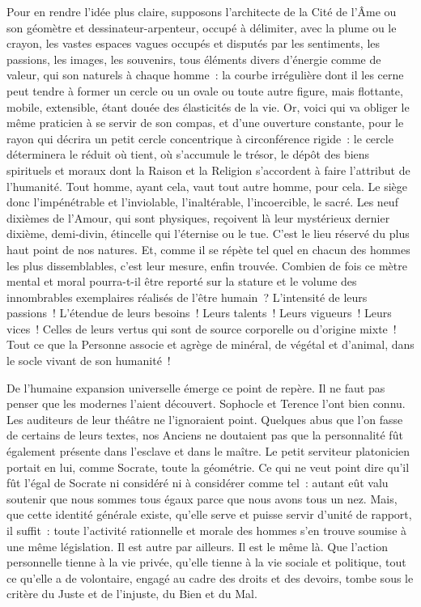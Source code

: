 \documentclass[french,twoside]{book} %
\begin{document}
Pour en rendre l’idée plus claire, supposons l’architecte de la Cité de l’Âme ou son géomètre et dessinateur-arpenteur, occupé à délimiter, avec la plume ou le crayon, les vastes espaces vagues occupés et disputés par les sentiments, les passions, les images, les souvenirs, tous éléments divers d’énergie comme de valeur, qui son naturels à chaque homme : la courbe irrégulière dont il les cerne peut tendre à former un cercle ou un ovale ou toute autre figure, mais flottante, mobile, extensible, étant douée des élasticités de la vie. Or, voici qui va obliger le même praticien à se servir de son compas, et d’une ouverture constante, pour le rayon qui décrira un petit cercle concentrique à circonférence rigide : le cercle déterminera le réduit où tient, où s’accumule le trésor, le dépôt des biens spirituels et moraux dont la Raison et la Religion s’accordent à faire l’attribut de l’humanité. Tout homme, ayant cela, vaut tout autre homme, pour cela. Le siège donc l’impénétrable et l’inviolable, l’inaltérable, l’incoercible, le sacré. Les neuf dixièmes de l’Amour, qui sont physiques, reçoivent là leur mystérieux dernier dixième, demi-divin, étincelle qui l’éternise ou le tue. C’est le lieu réservé du plus haut point de nos natures. Et, comme il se répète tel quel en chacun des hommes les plus dissemblables, c’est leur mesure, enfin trouvée. Combien de fois ce mètre mental et moral pourra-t-il être reporté sur la stature et le volume des innombrables exemplaires réalisés de l’être humain ? L’intensité de leurs passions ! L’étendue de leurs besoins ! Leurs talents ! Leurs vigueurs ! Leurs vices ! Celles de leurs vertus qui sont de source corporelle ou d’origine mixte ! Tout ce que la Personne associe et agrège de minéral, de végétal et d’animal, dans le socle vivant de son humanité !\par
De l’humaine expansion universelle émerge ce point de repère. Il ne faut pas penser que les modernes l’aient découvert. Sophocle et Terence l’ont bien connu. Les auditeurs de leur théâtre ne l’ignoraient point. Quelques abus que l’on fasse de certains de leurs textes, nos Anciens ne doutaient pas que la personnalité fût également présente dans l’esclave et dans le maître. Le petit serviteur platonicien portait en lui, comme Socrate, toute la géométrie. Ce qui ne veut point dire qu’il fût l’égal de Socrate ni considéré ni à considérer comme tel : autant eût valu soutenir que nous sommes tous égaux parce que nous avons tous un nez. Mais, que cette identité générale existe, qu’elle serve et puisse servir d’unité de rapport, il suffit : toute l’activité rationnelle et morale des hommes s’en trouve soumise à une même législation. Il est autre par ailleurs. Il est le même là. Que l’action personnelle tienne à la vie privée, qu’elle tienne à la vie sociale et politique, tout ce qu’elle a de volontaire, engagé au cadre des droits et des devoirs, tombe sous le critère du Juste et de l’injuste, du Bien et du Mal.\par
\end{document}
